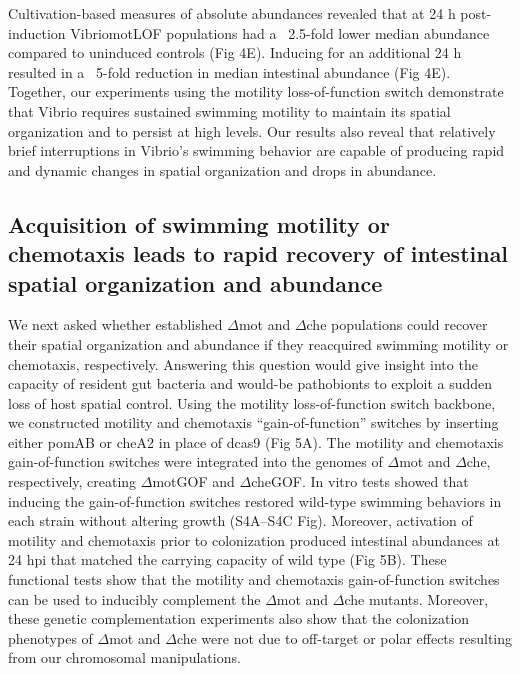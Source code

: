Cultivation-based measures of absolute abundances revealed that at 24 h post-induction VibriomotLOF populations had a ~2.5-fold lower median abundance compared to uninduced controls (Fig 4E). Inducing for an additional 24 h resulted in a ~5-fold reduction in median intestinal abundance (Fig 4E). Together, our experiments using the motility loss-of-function switch demonstrate that Vibrio requires sustained swimming motility to maintain its spatial organization and to persist at high levels. Our results also reveal that relatively brief interruptions in Vibrio's swimming behavior are capable of producing rapid and dynamic changes in spatial organization and drops in abundance.


\subsection{Acquisition of swimming motility or chemotaxis leads to rapid recovery of intestinal spatial organization and abundance}
We next asked whether established $\Delta$mot and $\Delta$che populations could recover their spatial organization and abundance if they reacquired swimming motility or chemotaxis, respectively. Answering this question would give insight into the capacity of resident gut bacteria and would-be pathobionts to exploit a sudden loss of host spatial control. Using the motility loss-of-function switch backbone, we constructed motility and chemotaxis ``gain-of-function'' switches by inserting either pomAB or cheA2 in place of dcas9 (Fig 5A). The motility and chemotaxis gain-of-function switches were integrated into the genomes of $\Delta$mot and $\Delta$che, respectively, creating $\Delta$motGOF and $\Delta$cheGOF. In vitro tests showed that inducing the gain-of-function switches restored wild-type swimming behaviors in each strain without altering growth (S4A–S4C Fig). Moreover, activation of motility and chemotaxis prior to colonization produced intestinal abundances at 24 hpi that matched the carrying capacity of wild type (Fig 5B). These functional tests show that the motility and chemotaxis gain-of-function switches can be used to inducibly complement the $\Delta$mot and $\Delta$che mutants. Moreover, these genetic complementation experiments also show that the colonization phenotypes of $\Delta$mot and $\Delta$che were not due to off-target or polar effects resulting from our chromosomal manipulations.

